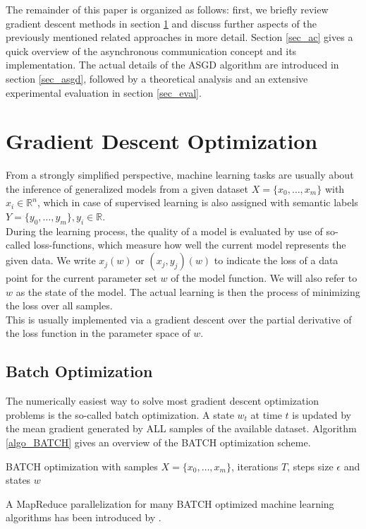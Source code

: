 \documentclass{acm_proc_article-sp}
\begin{document}
The remainder of this paper is organized as follows: first, we briefly review 
gradient descent methods in section \ref{sec_gd} and discuss further
aspects of the 
previously mentioned related approaches in more detail. Section \ref{sec_ac}
gives a quick overview of the asynchronous communication concept and its 
implementation. The actual details of the ASGD algorithm are introduced 
in section \ref{sec_asgd},
followed by a theoretical analysis and an extensive experimental evaluation in 
section \ref{sec_eval}.      

\section{Gradient Descent Optimization}\label{sec_gd}
From a strongly simplified perspective, machine learning tasks are usually about the 
inference of generalized models from a given dataset $X=\{x_0,\dots,x_m\}$ with $ x_i
\in\mathbb{R}^n$, 
which in case of supervised learning is also assigned with semantic labels 
$Y=\{y_0,\dots,y_m\}, y_i\in\mathbb{R}$.\\
During the learning process, the quality of a model is
evaluated by use of so-called loss-functions, which measure how well the current model 
represents the given data. We write $x_j(w)$ or $(x_j,y_j)(w)$ to indicate the 
loss of a data point for the current parameter set $w$ of the model function.
We will also refer to $w$ as the state of the model. The actual learning
is then the process of minimizing the loss over all samples.\\
This is usually implemented via a gradient descent over the partial derivative of
the loss function in the parameter space of $w$.   

\subsection{Batch Optimization}
The numerically easiest way to solve most gradient descent optimization
problems is the so-called batch optimization. A state $w_t$ at time $t$
is updated by the mean gradient generated by ALL samples of the available
dataset. Algorithm \ref{algo_BATCH} gives an overview of the BATCH optimization
scheme.  
\begin{algorithm}
\caption{BATCH optimization with
samples $X=\{x_0,\dots,x_m\}$,
iterations $T$, steps size
$\epsilon$ and
states $w$}
\label{algo_BATCH}
\begin{algorithmic}[1]
\EndFor
\end{algorithmic}
\end{algorithm}
A MapReduce parallelization for many BATCH optimized machine learning 
algorithms has been introduced by \cite{chu2007map}.
\end{document}
